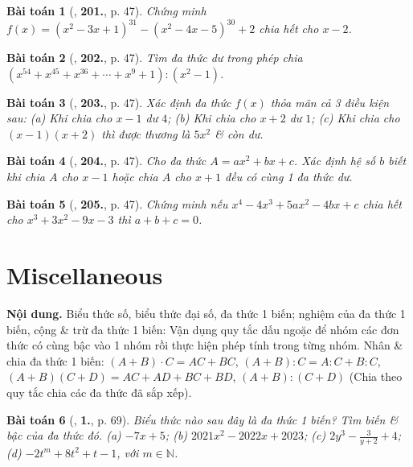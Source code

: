 \documentclass{article}
\numberwithin{equation}{section}
\newtheorem{baitoan}{Bài toán}
\begin{document}
\begin{baitoan}[\cite{Tuyen_Toan_7}, \textbf{201.}, p. 47]
	Chứng minh $f(x) = (x^2 - 3x + 1)^{31} - (x^2 - 4x - 5)^{30} + 2$ chia hết cho $x - 2$.
\end{baitoan}

\begin{baitoan}[\cite{Tuyen_Toan_7}, \textbf{202.}, p. 47]
	Tìm đa thức dư trong phép chia $(x^{54} + x^{45} + x^{36} + \cdots + x^9 + 1):(x^2 - 1)$.
\end{baitoan}

\begin{baitoan}[\cite{Tuyen_Toan_7}, \textbf{203.}, p. 47]
	Xác định đa thức $f(x)$ thỏa mãn cả 3 điều kiện sau: (a) Khi chia cho $x - 1$ dư $4$; (b) Khi chia cho $x + 2$ dư $1$; (c) Khi chia cho $(x - 1)(x + 2)$ thì được thương là $5x^2$ \& còn dư.
\end{baitoan}

\begin{baitoan}[\cite{Tuyen_Toan_7}, \textbf{204.}, p. 47]
	Cho đa thức $A = ax^2 + bx + c$. Xác định hệ số $b$ biết khi chia $A$ cho $x - 1$ hoặc chia $A$ cho $x + 1$ đều có cùng 1 đa thức dư.
\end{baitoan}

\begin{baitoan}[\cite{Tuyen_Toan_7}, \textbf{205.}, p. 47]
	Chứng minh nếu $x^4 - 4x^3 + 5ax^2 - 4bx + c$ chia hết cho $x^3 + 3x^2 - 9x - 3$ thì $a + b + c = 0$.
\end{baitoan}


\section{Miscellaneous}
\textsf{\textbf{Nội dung.} Biểu thức số, biểu thức đại số, đa thức 1 biến; nghiệm của đa thức 1 biến, cộng \& trừ đa thức 1 biến:} Vận dụng quy tắc dấu ngoặc để nhóm các đơn thức có cùng bậc vào 1 nhóm rồi thực hiện phép tính trong từng nhóm. \textsf{Nhân \& chia đa thức 1 biến:} $(A + B)\cdot C = AC + BC$, $(A + B):C = A:C + B:C$, $(A + B)(C + D) = AC + AD + BC + BD$, $(A + B):(C + D)$ (Chia theo quy tắc chia các đa thức đã sắp xếp).

\begin{baitoan}[\cite{SGK_Toan_7_Canh_Dieu_tap_2}, \textbf{1.}, p. 69]
	Biểu thức nào sau đây là đa thức 1 biến? Tìm biến \& bậc của đa thức đó. (a) $-7x + 5$; (b) $2021x^2 - 2022x + 2023$; (c) $2y^3 - \frac{3}{y + 2} + 4$; (d) $-2t^m + 8t^2 + t - 1$, với $m\in\mathbb{N}$.
\end{baitoan}
\end{document}
